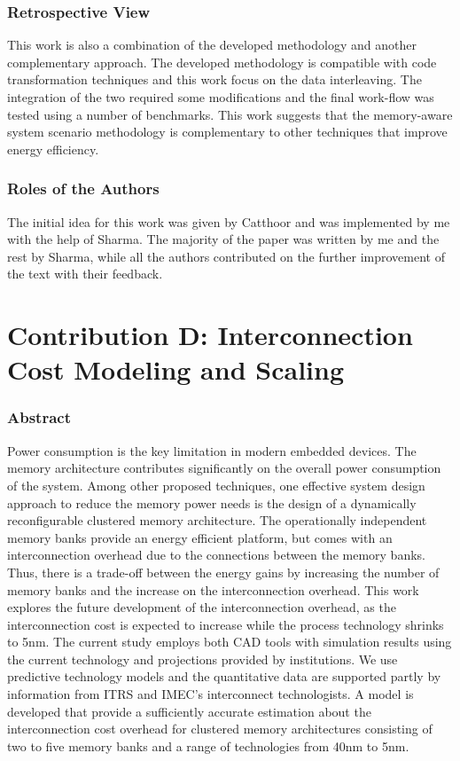 \subsubsection{Retrospective View}

This work is also a combination of the developed methodology and another complementary approach.
The developed methodology is compatible with code transformation techniques and this work focus on the data interleaving.
The integration of the two required some modifications and the final work-flow was tested using a number of benchmarks.
This work suggests that the memory-aware system scenario methodology is complementary to other techniques that improve energy efficiency.

\subsubsection{Roles of the Authors}

The initial idea for this work was given by Catthoor and was implemented by me with the help of Sharma.
The majority of the paper was written by me and the rest by Sharma, while all the authors contributed on the further improvement of the text with their feedback.

\section{Contribution D: Interconnection Cost Modeling and Scaling}

\subsubsection{Abstract}
Power consumption is the key limitation in modern embedded devices.
The memory architecture contributes significantly on the overall power consumption of the system.
Among other proposed techniques, one effective system design approach to reduce the memory power needs is the design of a dynamically reconfigurable clustered memory architecture.
The operationally independent memory banks provide an energy efficient platform, but comes with an interconnection overhead due to the connections between the memory banks. 
Thus, there is a trade-off between the energy gains by increasing the number of memory banks and the increase on the interconnection overhead.
This work explores the future development of the interconnection overhead, as the interconnection cost is expected to increase while the process technology shrinks to 5nm.
The current study employs both CAD tools with simulation results using the current technology and projections provided by institutions.
We use predictive technology models and the quantitative data are supported partly by information
from ITRS and IMEC's interconnect technologists.
A model is developed that provide a sufficiently accurate estimation about the interconnection cost overhead for clustered memory architectures consisting of two to five memory banks and a range of technologies from 40nm to 5nm.  

